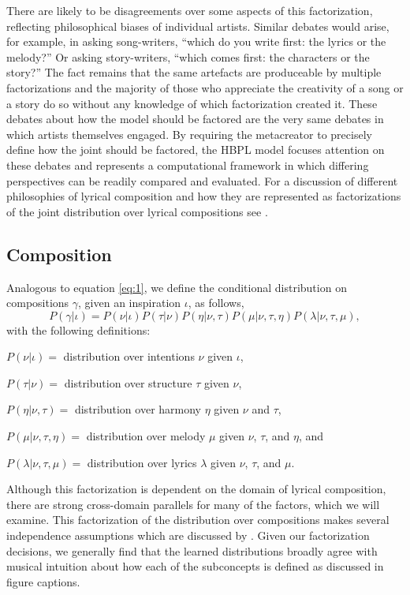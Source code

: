 \documentclass[phd,electronic,oneside,twosidetoc,letterpaper,chaptercenter,parttop,lof,lot]{byumsphd}
\begin{document}
There are likely to be disagreements over some aspects of this factorization, reflecting philosophical biases of individual artists. Similar debates would arise, for example, in asking song-writers, ``which do you write first: the lyrics or the melody?'' Or asking story-writers, ``which comes first: the characters or the story?'' The fact remains that the same artefacts are produceable by multiple factorizations and the majority of those who appreciate the creativity of a song or a story do so without any knowledge of which factorization created it. These debates about how the model should be factored are the very same debates in which artists themselves engaged. By requiring the metacreator to precisely define how the joint should be factored, the HBPL model focuses attention on these debates and represents a computational framework in which differing perspectives can be readily compared and evaluated. For a discussion of different philosophies of lyrical composition and how they are represented as factorizations of the joint distribution over lyrical compositions see \cite{bodily2017Mume}.

\subsection{Composition}

Analogous to equation \ref{eq:1}, we define the conditional distribution on compositions $\gamma$, given an inspiration $\iota$, as follows,
\[ P(\gamma|\iota) = P(\nu|\iota)P(\tau|\nu)P(\eta|\nu,\tau)P(\mu|\nu,\tau,\eta)P(\lambda|\nu,\tau,\mu), \] 
\noindent with the following definitions:

\(P(\nu|\iota)=\) distribution over intentions $\nu$ given $\iota$,

\(P(\tau|\nu)=\) distribution over structure $\tau$ given $\nu$,

\(P(\eta|\nu,\tau)=\) distribution over harmony $\eta$ given $\nu$ and $\tau$,

\(P(\mu|\nu,\tau,\eta)=\) distribution over melody $\mu$ given $\nu$, $\tau$, and $\eta$, and

\(P(\lambda|\nu,\tau,\mu)=\) distribution over lyrics $\lambda$ given $\nu$, $\tau$, and $\mu$.

Although this factorization is dependent on the domain of lyrical composition, there are strong cross-domain parallels for many of the factors, which we will examine. This factorization of the distribution over compositions makes several independence assumptions which are discussed by \citeauthor{bodily2017Mume} \cite{bodily2017Mume}. Given our factorization decisions, we generally find that the learned distributions broadly agree with musical intuition about how each of the subconcepts is defined as discussed in figure captions.
\end{document}
